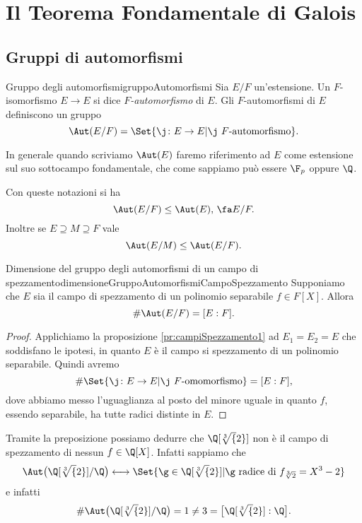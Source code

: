 \chapter{Il Teorema Fondamentale di Galois}
\section{Gruppi di automorfismi}

\begin{defn}{Gruppo degli automorfismi}{gruppoAutomorfismi}
	Sia \(E/F\) un'estensione. Un \(F\)-isomorfismo \(E\to E\) si dice \emph{\(F\)-automorfismo} di \(E\).
	Gli \(F\)-automorfismi di \(E\) definiscono un gruppo
	\[
		\Aut(E/F) = \Set{\j\colon E \to E | \j \text{ \(F\)-automorfismo}}.
	\]
\end{defn}

\begin{notz}
	In generale quando scriviamo \(\Aut(E)\) faremo riferimento ad \(E\) come estensione sul suo sottocampo fondamentale, che come sappiamo può essere \(\F_p\) oppure \(\Q\).
\end{notz}

\begin{oss}
	Con queste notazioni si ha
	\[
		\Aut(E/F) \le \Aut(E), \,\fa E/F.
	\]
	Inoltre se \(E\supseteq M \supseteq F\) vale
	\[
		\Aut(E/M) \le \Aut(E/F).
	\]
\end{oss}

\begin{prop}{Dimensione del gruppo degli automorfismi di un campo di spezzamento}{dimensioneGruppoAutomorfismiCampoSpezzamento}
	Supponiamo che \(E\) sia il campo di spezzamento di un polinomio separabile \(f\in F[X]\). Allora
	\[
		\#\Aut(E/F) = [E:F].
	\]
\end{prop}

\begin{proof}
	Applichiamo la proposizione \autoref{pr:campiSpezzamento1} ad \(E_1=E_2=E\) che soddisfano le ipotesi, in quanto \(E\) è il campo si spezzamento di un polinomio separabile. Quindi avremo
	\[
		\#\Set{\j\colon E \to E | \j \text{ \(F\)-omomorfismo}} = [E:F],
	\]
	dove abbiamo messo l'uguaglianza al posto del minore uguale in quanto \(f\), essendo separabile, ha tutte radici distinte in \(E\).
\end{proof}

\begin{ese}
	Tramite la preposizione possiamo dedurre che \(\Q[\sqrt[3]{2}]\) non è il campo di spezzamento di nessun \(f\in \Q[X]\). Infatti sappiamo che
	\[
		\Aut\big(\Q[\sqrt[3]{2}]/\Q\big) \longleftrightarrow \Set{\g\in \Q[\sqrt[3]{2}] | \g\text{ radice di \(f_{\sqrt[3]{2}}=X^3-2\)}}
	\]
	e infatti
	\[
		\# \Aut\big(\Q[\sqrt[3]{2}]/\Q\big) = 1 \neq 3 = \big[\Q[\sqrt[3]{2}]:\Q\big].
	\]
\end{ese}

